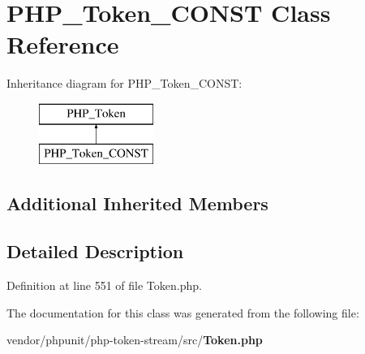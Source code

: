 \section{P\+H\+P\+\_\+\+Token\+\_\+\+C\+O\+N\+S\+T Class Reference}
\label{class_p_h_p___token___c_o_n_s_t}
Inheritance diagram for P\+H\+P\+\_\+\+Token\+\_\+\+C\+O\+N\+S\+T\+:\begin{figure}[H]
\begin{center}
\leavevmode
\includegraphics[height=2.000000cm]{class_p_h_p___token___c_o_n_s_t}
\end{center}
\end{figure}
\subsection*{Additional Inherited Members}


\subsection{Detailed Description}


Definition at line 551 of file Token.\+php.



The documentation for this class was generated from the following file\+:\begin{DoxyCompactItemize}
\item 
vendor/phpunit/php-\/token-\/stream/src/{\bf Token.\+php}\end{DoxyCompactItemize}

